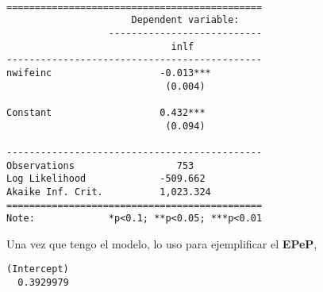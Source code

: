 \documentclass[
  letterpaper,
  DIV=11,
  numbers=noendperiod]{scrreprt}
\newenvironment{Shaded}{\begin{snugshade}}{\end{snugshade}}
\newcommand{\ControlFlowTok}[1]{\textcolor[rgb]{0.00,0.23,0.31}{\textbf{#1}}}
\newcommand{\DecValTok}[1]{\textcolor[rgb]{0.68,0.00,0.00}{#1}}
\newcommand{\FunctionTok}[1]{\textcolor[rgb]{0.28,0.35,0.67}{#1}}
\newcommand{\NormalTok}[1]{\textcolor[rgb]{0.00,0.23,0.31}{#1}}
\newcommand{\OtherTok}[1]{\textcolor[rgb]{0.00,0.23,0.31}{#1}}
\newcommand{\SpecialCharTok}[1]{\textcolor[rgb]{0.37,0.37,0.37}{#1}}
\begin{document}
\begin{verbatim}

=============================================
                      Dependent variable:    
                  ---------------------------
                             inlf            
---------------------------------------------
nwifeinc                   -0.013***         
                            (0.004)          
                                             
Constant                   0.432***          
                            (0.094)          
                                             
---------------------------------------------
Observations                  753            
Log Likelihood             -509.662          
Akaike Inf. Crit.          1,023.324         
=============================================
Note:             *p<0.1; **p<0.05; ***p<0.01
\end{verbatim}

Una vez que tengo el modelo, lo uso para ejemplificar el \textbf{EPeP},

\begin{Shaded}
\end{Shaded}

\begin{verbatim}
(Intercept) 
  0.3929979 
\end{verbatim}

\begin{Shaded}
\end{Shaded}
\end{document}
